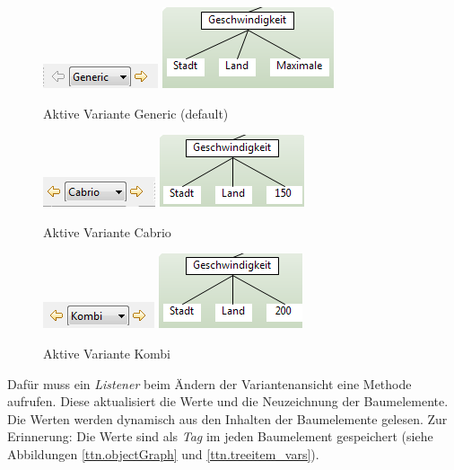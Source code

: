\begin{figure}[h!]
  \begin{center}
    \includegraphics{4_2_Change_Var_Generic.png}
    \includegraphics[scale=0.8]{4_2_Change_Var_Generic_Tree.png}
  		  \caption{Aktive Variante Generic (default)}
     \label{ttn.generic}
  \end{center}
\end{figure}

\begin{figure}[h!]
  \begin{center}
    \includegraphics{4_2_Change_Var_Cabrio.png}
    \includegraphics[scale=0.9]{4_2_Change_Var_Cabrio_Tree.png}
  		  \caption{Aktive Variante Cabrio}
     \label{ttn.2}
  \end{center}
\end{figure}

\begin{figure}[h!]
  \begin{center}
    \includegraphics{4_2_Change_Var_Kombi.png}
    \includegraphics[scale=0.9]{4_2_Change_Var_Kombi_Tree.png}
  		  \caption{Aktive Variante Kombi}
     \label{ttn.3}
  \end{center}
\end{figure}

Dafür muss ein \textit{Listener} beim Ändern der Variantenansicht eine Methode aufrufen. Diese aktualisiert die Werte und die Neuzeichnung der Baumelemente. Die Werten werden dynamisch aus den Inhalten der Baumelemente gelesen. Zur Erinnerung: Die Werte sind als \textit{Tag} im jeden Baumelement gespeichert (siehe Abbildungen \ref{ttn.objectGraph} und \ref{ttn.treeitem_vars}).


